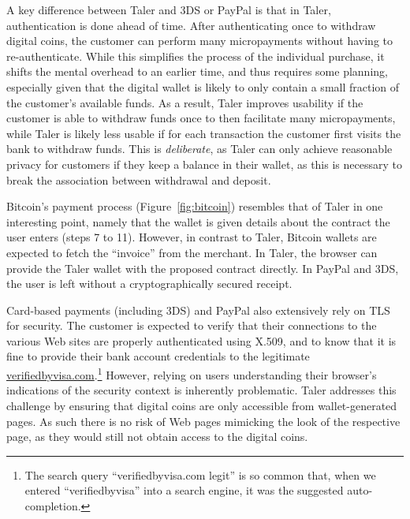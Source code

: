 \documentclass{llncs}
\begin{document}
A key difference between Taler and 3DS or PayPal is that
in Taler, authentication is done ahead of time.
After authenticating once to withdraw digital coins, the customer can
perform many micropayments without having to re-authenticate.  While
this simplifies the process of the individual purchase, it shifts the
mental overhead to an earlier time, and thus requires some planning,
especially given that the digital wallet is likely to only contain a
small fraction of the customer's available funds.  As a result, Taler
improves usability if the customer is able to withdraw funds once to
then facilitate many micropayments, while Taler is likely less usable
if for each transaction the customer first visits the bank to withdraw
funds.  This is {\em deliberate}, as Taler can only achieve reasonable
privacy for customers if they keep a balance in their wallet, as
this is necessary to break the association between withdrawal and deposit.

Bitcoin's payment process (Figure~\ref{fig:bitcoin}) resembles that of
Taler in one interesting point, namely that the wallet is given
details about the contract the user enters (steps 7 to 11).
However, in contrast to Taler, Bitcoin wallets are expected
to fetch the ``invoice'' from the merchant. In Taler, the browser
can provide the Taler wallet with the proposed contract directly.  In
PayPal and 3DS, the user is left without a cryptographically secured
receipt.

Card-based payments (including 3DS) and PayPal also extensively rely
on TLS for security.  The customer is expected to verify that their
connections to the various Web sites are properly authenticated using
X.509, and to know that it is fine to provide their bank account
credentials to the legitimate
\url{verifiedbyvisa.com}.\footnote{The search query
``verifiedbyvisa.com legit'' is so common that, when we entered
``verifiedbyvisa'' into a search engine, it was the suggested
auto-completion.}  However, relying on users understanding their
browser's indications of the security context is inherently
problematic.  Taler addresses this challenge by ensuring that digital
coins are only accessible from wallet-generated pages. As such
there is no risk of Web pages mimicking the look of the respective
page, as they would still not obtain access to the digital coins.
\end{document}
